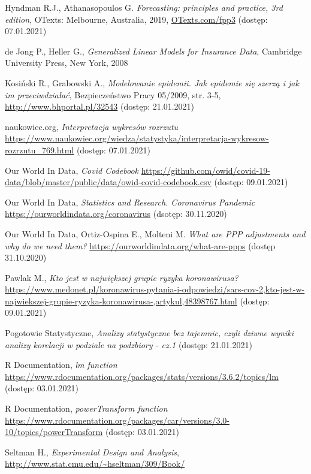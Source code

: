 \documentclass[12pt]{mwbk}
\theoremstyle{plain}
\theoremstyle{definition}
\theoremstyle{definition}
\begin{document}
\begin{thebibliography}{99}
 Hyndman R.J.,  Athanasopoulos G. \emph{Forecasting: principles and practice, 3rd edition}, OTexts: Melbourne, Australia, 2019, \url{OTexts.com/fpp3} (dostęp: 07.01.2021)

 de Jong P., Heller G., \emph{Generalized Linear Models for Insurance Data}, Cambridge University Press, New York, 2008

 Kosiński R., Grabowski A., \emph{Modelowanie epidemii. Jak epidemie się szerzą i jak im przeciwdziałać}, Bezpieczeństwo Pracy 05/2009, str. 3-5, \url{http://www.bhportal.pl/32543} (dostęp: 21.01.2021)

 naukowiec.org, \emph{Interpretacja wykresów rozrzutu} \url{https://www.naukowiec.org/wiedza/statystyka/interpretacja-wykresow-rozrzutu_769.html} (dostęp: 07.01.2021)

 Our World In Data, \emph{Covid Codebook} \url{https://github.com/owid/covid-19-data/blob/master/public/data/owid-covid-codebook.csv} (dostęp: 09.01.2021)

 Our World In Data, \emph{Statistics and Research. Coronavirus Pandemic} \url{https://ourworldindata.org/coronavirus} (dsotęp: 30.11.2020)

 Our World In Data, Ortiz-Ospina E., Molteni M. \emph{What are PPP adjustments and why do we need them?} \url{https://ourworldindata.org/what-are-ppps} (dostęp 31.10.2020)

 Pawlak M., \emph{Kto jest w największej grupie ryzyka koronawirusa?} \url{https://www.medonet.pl/koronawirus-pytania-i-odpowiedzi/sars-cov-2,kto-jest-w-najwiekszej-grupie-ryzyka-koronawirusa-,artykul,48398767.html} (dostęp: 09.01.2021)

 Pogotowie Statystyczne, \emph{Analizy statystyczne bez tajemnic, czyli dziwne wyniki analizy korelacji w podziale na podzbiory - cz.1} (dostęp: 21.01.2021)

 R Documentation, \emph{lm function} \url{https://www.rdocumentation.org/packages/stats/versions/3.6.2/topics/lm} (dostęp: 03.01.2021)

 R Documentation, \emph{powerTransform function} \url{https://www.rdocumentation.org/packages/car/versions/3.0-10/topics/powerTransform} (dostęp: 03.01.2021)

 Seltman H., \emph{Experimental Design and Analysis}, \url{http://www.stat.cmu.edu/~hseltman/309/Book/}


\end{thebibliography}
\end{document}
